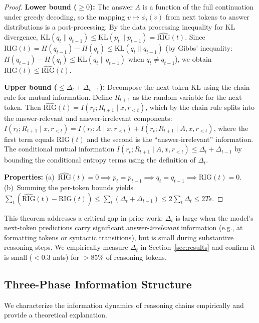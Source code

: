 \documentclass{article}
\newcommand{\RIG}{\mathrm{RIG}}
\newcommand{\KL}{\mathrm{KL}}
\begin{document}
\begin{proof}
\textbf{Lower bound ($\geq 0$):} The answer $A$ is a function of the full continuation under greedy decoding, so the mapping $v \mapsto \phi_t(v)$ from next tokens to answer distributions is a post-processing. By the data processing inequality for KL divergence, $\KL(q_t \| q_{t-1}) \leq \KL(p_t \| p_{t-1}) = \widehat{\RIG}(t)$. Since $\RIG(t) = H(q_{t-1}) - H(q_t) \leq \KL(q_t \| q_{t-1})$ (by Gibbs' inequality: $H(q_{t-1}) - H(q_t) \leq \KL(q_t \| q_{t-1})$ when $q_t \neq q_{t-1}$), we obtain $\RIG(t) \leq \widehat{\RIG}(t)$.

\textbf{Upper bound ($\leq \Delta_t + \Delta_{t-1}$):} Decompose the next-token KL using the chain rule for mutual information. Define $R_{t+1}$ as the random variable for the next token. Then $\widehat{\RIG}(t) = I(r_t; R_{t+1} \mid x, r_{<t})$, which by the chain rule splits into the answer-relevant and answer-irrelevant components: $I(r_t; R_{t+1} \mid x, r_{<t}) = I(r_t; A \mid x, r_{<t}) + I(r_t; R_{t+1} \mid A, x, r_{<t})$, where the first term equals $\RIG(t)$ and the second is the ``answer-irrelevant'' information. The conditional mutual information $I(r_t; R_{t+1} \mid A, x, r_{<t}) \leq \Delta_t + \Delta_{t-1}$ by bounding the conditional entropy terms using the definition of $\Delta_t$.

\textbf{Properties:} (a)~$\widehat{\RIG}(t) = 0 \implies p_t = p_{t-1} \implies q_t = q_{t-1} \implies \RIG(t) = 0$. (b)~Summing the per-token bounds yields $\sum_t (\widehat{\RIG}(t) - \RIG(t)) \leq \sum_t (\Delta_t + \Delta_{t-1}) \leq 2\sum_t \Delta_t \leq 2T\epsilon$.
\end{proof}

This theorem addresses a critical gap in prior work: $\Delta_t$ is large when the model's next-token predictions carry significant answer-\emph{irrelevant} information (e.g., at formatting tokens or syntactic transitions), but is small during substantive reasoning steps. We empirically measure $\Delta_t$ in Section~\ref{sec:results} and confirm it is small ($<0.3$ nats) for $>$85\% of reasoning tokens.

\subsection{Three-Phase Information Structure}
\label{sec:phases}

We characterize the information dynamics of reasoning chains empirically and provide a theoretical explanation.
\end{document}
